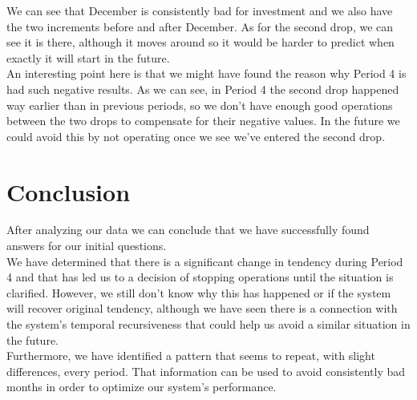 \documentclass[sigconf, nonacm]{acmart}
\begin{document}
We can see that December is consistently bad for investment and we also have the two increments before and after December. As for the second drop, we can see it is there, although it moves around so it would be harder to predict when exactly it will start in the future.\\

An interesting point here is that we might have found the reason why Period 4 is had such negative results. As we can see, in Period 4 the second drop happened way earlier than in previous periods, so we don't have enough good operations between the two drops to compensate for their negative values. In the future we could avoid this by not operating once we see we've entered the second drop.

\section{Conclusion}
After analyzing our data we can conclude that we have successfully found answers for our initial questions.\\

We have determined that there is a significant change in tendency during Period 4 and that has led us to a decision of stopping operations until the situation is clarified. However, we still don't know why this has happened or if the system will recover original tendency, although we have seen there is a connection with the system's temporal recursiveness that could help us avoid a similar situation in the future.\\

Furthermore, we have identified a pattern that seems to repeat, with slight differences, every period. That information can be used to avoid consistently bad months in order to optimize our system's performance.
\end{document}
